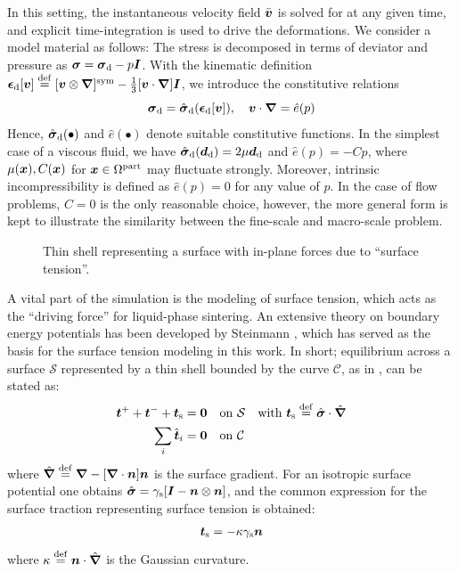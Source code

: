 \documentclass[MikaelDissertation.tex]{subfiles}
\begin{document}
In this setting, the instantaneous velocity field $\bar{\boldsymbol{v}}$ is solved for at any given time, and explicit time-integration is used to drive the deformations.
We consider a model material as follows: The stress is decomposed in terms of deviator and pressure as $\boldsymbol{\sigma} = \boldsymbol{\sigma}_{\mathrm{d}} - p\boldsymbol{I}$.
With the kinematic definition $\boldsymbol{\epsilon}_{\mathrm{d}}[\boldsymbol{v}]\overset{\mathrm{def}}{=}[\boldsymbol{v}\mathbin{\otimes}\boldsymbol{\nabla}]^{\mathrm{sym}}-\frac{1}{3}[\boldsymbol{v}\cdot\boldsymbol{\nabla}]\boldsymbol{I}$, we introduce the constitutive relations
\begin{equation}
    \boldsymbol{\sigma}_{\mathrm{d}} = \hat{\boldsymbol{\sigma}}_{\mathrm{d}}(\boldsymbol{\epsilon}_{\mathrm{d}}[\boldsymbol{v}]), \quad
    \boldsymbol{v}\cdot\boldsymbol{\nabla} = \hat{e}(p)
\label{eq201}
\end{equation}
Hence, $\hat{\boldsymbol{\sigma}}_{\mathrm{d}}(\bullet)$ and $\hat{e}(\bullet)$ denote suitable constitutive functions.
In the simplest case of a viscous fluid, we have $\hat{\boldsymbol{\sigma}}_{\mathrm{d}}(\boldsymbol{d}_{\mathrm{d}})=2\mu\boldsymbol{d}_{\mathrm{d}}$ and $\hat{e}(p)=- C p$, where $\mu(\boldsymbol{x}), C(\boldsymbol{x})$ for $\boldsymbol{x}\in\Omega^{\mathrm{part}}$ may fluctuate strongly.
Moreover, intrinsic incompressibility is defined as $\hat{e}(p)=0$ for any value of $p$.
In the case of flow problems, $C = 0$ is the only reasonable choice, however, the more general form is kept to illustrate the similarity between the fine-scale and macro-scale problem.

\begin{figure}[th!]
    \centering
    
    \caption{Thin shell representing a surface with in-plane forces due to ``surface tension''.}
    \label{fig:surfacestress}
\end{figure}
A vital part of the simulation is the modeling of surface tension, which acts as the ``driving force'' for liquid-phase sintering.
An extensive theory on boundary energy potentials has been developed by Steinmann \cite{steinmann_boundary_2008}, which has served as the basis for the surface tension modeling in this work.
In short; equilibrium across a surface $\mathcal{S}$ represented by a thin shell bounded by the curve $\mathcal{C}$, as in , can be stated as:
\begin{align}
    \boldsymbol{t}^+ + \boldsymbol{t}^- + \boldsymbol{t}_{\mathrm{s}} &= \boldsymbol{0} \quad \text{on} \,\, \mathcal{S} \quad \text{with } \boldsymbol{t}_{\mathrm{s}} \overset{\mathrm{def}}{=} \hat{\boldsymbol{\sigma}}\cdot\hat{\boldsymbol{\nabla}}
\label{eq103KR}\\
    \sum_i \hat{\boldsymbol{t}}_i &= \boldsymbol{0} \quad \text{on} \,\, \mathcal{C}
\label{eq104KR}
\end{align}
where $\hat{\boldsymbol{\nabla}} \overset{\mathrm{def}}{=} \boldsymbol{\nabla} - [\boldsymbol{\nabla}\cdot\boldsymbol{n}]\boldsymbol{n}$ is the surface gradient.
For an isotropic surface potential one obtains $\hat{\boldsymbol{\sigma}} = \gamma_{\mathrm{s}}[\boldsymbol{I}-\boldsymbol{n}\mathbin{\otimes}\boldsymbol{n}]$, and the common expression for the surface traction representing surface tension is obtained:
\begin{align}
 \boldsymbol{t}_{\mathrm{s}} = -\kappa \gamma_{\mathrm{s}} \boldsymbol{n}
\end{align}
where $\kappa \overset{\mathrm{def}}{=} \boldsymbol{n} \cdot\hat{\boldsymbol{\nabla}}$ is the Gaussian curvature.
\end{document}
